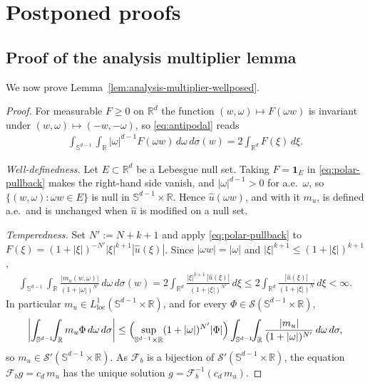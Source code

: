 \documentclass[12pt]{article}
\numberwithin{equation}{section}
\numberwithin{figure}{section}
\numberwithin{equation}{section}
\begin{document}
\newpage
\appendix
\section{Postponed proofs}\label{app:proofs}

\subsection{Proof of the analysis multiplier lemma}
\label{app:proof-of-analysis-wellposed}
We now prove Lemma~\ref{lem:analysis-multiplier-wellposed}.
\begin{proof}
For measurable $F\ge0$ on $\mathbb R^d$ the function $(w,\omega)\mapsto F(\omega w)$ is
invariant under $(w,\omega)\mapsto(-w,-\omega)$, so \eqref{eq:antipodal} reads
\begin{align}
    \int_{\mathbb S^{d-1}}\!\!\int_{\mathbb R}|\omega|^{d-1}F(\omega w)\,d\omega\,d\sigma(w)
    =2\int_{\mathbb R^d}F(\xi)\,d\xi .
    \label{eq:polar-pullback}
\end{align}

\emph{Well-definedness.} Let $E\subset\mathbb R^d$ be a Lebesgue null set. Taking
$F=\mathbf 1_E$ in \eqref{eq:polar-pullback} makes the right-hand side vanish, and
$|\omega|^{d-1}>0$ for a.e.\ $\omega$, so $\{(w,\omega):\omega w\in E\}$ is null in
$\mathbb S^{d-1}\times\mathbb R$. Hence $\widehat u(\omega w)$, and with it $m_u$, is
defined a.e.\ and is unchanged when $\widehat u$ is modified on a null set.

\emph{Temperedness.} Set $N':=N+k+1$ and apply \eqref{eq:polar-pullback} to
$F(\xi)=(1+|\xi|)^{-N'}|\xi|^{k+1}|\widehat u(\xi)|$. Since $|\omega w|=|\omega|$ and
$|\xi|^{k+1}\le(1+|\xi|)^{k+1}$,
\begin{align}
    \int_{\mathbb S^{d-1}}\!\!\int_{\mathbb R}
    \frac{|m_u(w,\omega)|}{(1+|\omega|)^{N'}}\,d\omega\,d\sigma(w)
    =2\int_{\mathbb R^d}\frac{|\xi|^{k+1}\,|\widehat u(\xi)|}{(1+|\xi|)^{N'}}\,d\xi
    \le 2\int_{\mathbb R^d}\frac{|\widehat u(\xi)|}{(1+|\xi|)^{N}}\,d\xi<\infty .
    \label{eq:mu-weighted-L1}
\end{align}
In particular $m_u\in L^1_{\mathrm{loc}}(\mathbb S^{d-1}\times\mathbb R)$, and for every
$\Phi\in\mathcal S(\mathbb S^{d-1}\times\mathbb R)$,
\begin{align*}
    \left|\int_{\mathbb S^{d-1}}\!\!\int_{\mathbb R}m_u\Phi\,d\omega\,d\sigma\right|
    \le\Bigl(\sup_{\mathbb S^{d-1}\times\mathbb R}(1+|\omega|)^{N'}|\Phi|\Bigr)
    \int_{\mathbb S^{d-1}}\!\!\int_{\mathbb R}
    \frac{|m_u|}{(1+|\omega|)^{N'}}\,d\omega\,d\sigma ,
\end{align*}
so $m_u\in\mathcal S'(\mathbb S^{d-1}\times\mathbb R)$. As $\mathcal F_b$ is a bijection of
$\mathcal S'(\mathbb S^{d-1}\times\mathbb R)$, the equation $\mathcal F_bg=c_d\,m_u$ has the
unique solution $g=\mathcal F_b^{-1}(c_d\,m_u)$.


\end{proof}
\end{document}
